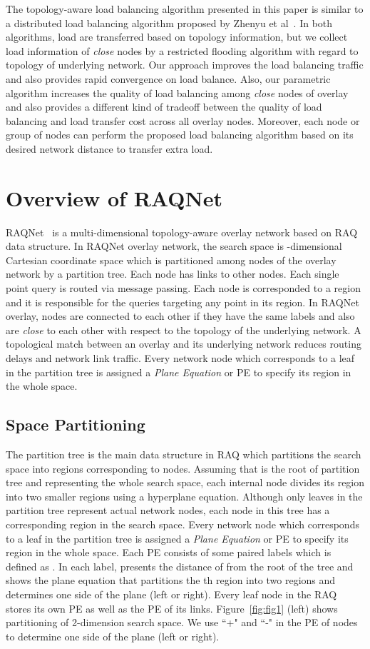 \documentclass {article}
\begin{document}
The topology-aware load balancing algorithm presented in this paper is similar to
a distributed load balancing algorithm  proposed by Zhenyu et al~\cite{disloadbalancing}. In both algorithms, load are transferred based on topology information, but we collect load information of \emph{close}
 nodes by a restricted flooding algorithm with regard  to topology of underlying network. Our approach
improves the load balancing traffic and also provides rapid convergence on load balance. Also, our parametric algorithm increases the quality of load balancing among \emph{close} nodes of overlay and also  provides a different kind of tradeoff between the quality of load balancing and load transfer cost across all overlay nodes.
Moreover, each node or group of nodes can perform the proposed load balancing algorithm based on its desired network distance to transfer extra load.
\section{Overview of RAQNet}\label{RAQNETSec}
RAQNet~\cite{RAQNet}  is a multi-dimensional topology-aware overlay network  based on RAQ~\cite{RAQ} data structure. In RAQNet overlay network, the search space is -dimensional Cartesian coordinate space which is
partitioned among  nodes of the overlay network by a partition
tree. Each node has  links to other nodes. Each single
point query is routed via  message passing. Each node is corresponded to a region and it is responsible for  the queries targeting any point in its region.
In RAQNet overlay, nodes are connected to each other if they have the
same labels and also are \emph{close} to each other with respect to the topology of
the underlying network. A topological match between an overlay and its underlying
network  reduces routing delays and network link traffic.
Every network node  which corresponds to a leaf in the partition
tree is assigned a {\it Plane Equation} or PE to specify its region in
the whole space.
\subsection{Space Partitioning}
The partition tree is the main data structure in RAQ which
partitions the search space into  regions corresponding to 
nodes. Assuming that  is the root of partition tree and representing
the whole search space, each internal node   divides its region into
two smaller regions using a hyperplane equation.  Although only
leaves in the partition tree represent actual network nodes, each
node in this tree has a corresponding region in the search space.
Every network node  which corresponds to a leaf in the partition
tree is assigned a {\it Plane Equation} or PE to specify its region in
the whole space. Each PE consists of some paired labels which is
defined as . In each label,   presents the
distance of  from the root of the tree and  shows the plane
equation that partitions the th region into two regions and 
determines one side of the plane  (left or right). Every leaf node in the RAQ stores its own PE as well as the PE of its links.  Figure~\ref{fig:fig1} (left) shows partitioning of 2-dimension search space.
We use ``+" and ``-" in the PE of nodes to determine one side of the plane (left or right).
\end{document}
